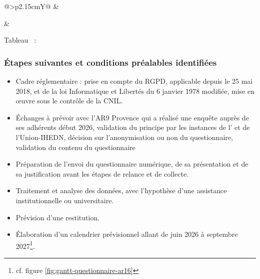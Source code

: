 \begin{xltabular}{\linewidth}{@{}>{\RaggedRight\arraybackslash}p{2.15cm}Y@{}}
 &
 \\
\addlinespace

 &
 \\

\end{xltabular}
\endgroup
\par\nopagebreak\vspace{0.4em}
\begin{center}
%
\label{tab:reunions_initiatives_comite}%
\label{tab:reunions_initiatives_comite_page_fin}%
%
Tableau~\thetable{} : \titreTableauReunionsInitiatives
\end{center}

\clearpage

\subsubsection*{Étapes suivantes et conditions préalables identifiées}

\begin{itemize}[leftmargin=*]
    \item Cadre réglementaire : prise en compte du RGPD, applicable depuis le 25 mai 2018, et de la loi Informatique et Libertés du 6 janvier 1978 modifiée, mise en œuvre sous le contrôle de la CNIL.
    \item Échanges à prévoir avec l'AR9 Provence qui a réalisé une enquête auprès de ses adhérents début 2026, validation du principe par les instances de l'\ARSeize{} et de l'Union-IHEDN, décision sur l'anonymisation ou non du questionnaire, validation du contenu du questionnaire
    \item Préparation de l'envoi du questionnaire numérique, de sa présentation et de sa justification avant les étapes de relance et de collecte.
    \item Traitement et analyse des données, avec l'hypothèse d'une assistance institutionnelle ou universitaire.
    \item Prévision d'une restitution.
    \item Élaboration d'un calendrier prévisionnel allant de juin 2026 à septembre 2027\footnote{cf. figure \ref{fig:gantt-questionnaire-ar16}}.
\end{itemize}

